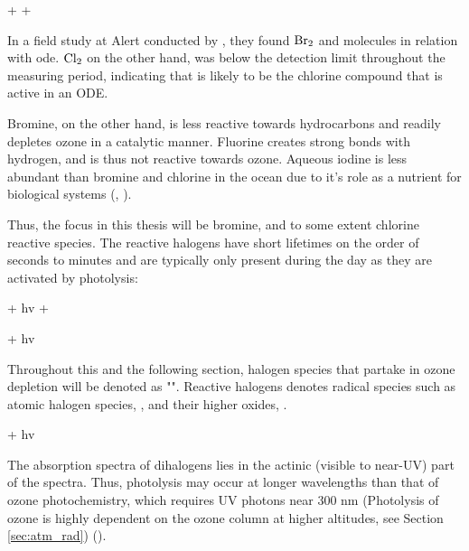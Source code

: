 \begin{reaction}
     +  \rightarrow {} + 
    \label{R:cl_ch4}
\end{reaction}

In a field study at Alert conducted by \cite{Foster2001}, they found $\mathrm{Br_2}$ and  molecules in relation with \acrshort{ode}. $\mathrm{Cl_2}$ on the other hand, was below the detection limit throughout the measuring period, indicating that  is likely to be the chlorine compound that is active in an ODE.

\medskip

Bromine, on the other hand, is less reactive towards hydrocarbons and readily depletes ozone in a catalytic manner.  Fluorine creates strong bonds with hydrogen, and is thus not reactive towards ozone. Aqueous iodine is less abundant than bromine and chlorine in the ocean due to it's role as a nutrient for biological systems (\cite{FinlaysonPitts2010}, \cite{Simpson2015}). 

\medskip

Thus, the focus in this thesis will be bromine, and to some extent chlorine reactive species. The reactive halogens have short lifetimes on the order of seconds to minutes and are typically only present during the day as they are activated by photolysis:



\begin{reaction}
     + hv \rightarrow {} + 
    \label{R:19}
\end{reaction}

\begin{reaction}
     + hv 
\end{reaction}

Throughout this and the following section, halogen species that partake in ozone depletion will be denoted as "". Reactive halogens denotes radical species such as atomic halogen species, , and their higher oxides, . 

\begin{reaction}
     + hv  \label{R:1}
\end{reaction}

The absorption spectra of dihalogens lies in the actinic (visible to near-UV) part of the spectra. Thus, photolysis may occur at longer wavelengths than that of ozone photochemistry, which requires UV photons near 300 nm (Photolysis of ozone is highly dependent on the ozone column at higher altitudes, see Section \ref{sec:atm_rad}) (\cite{Simpson2015}).

